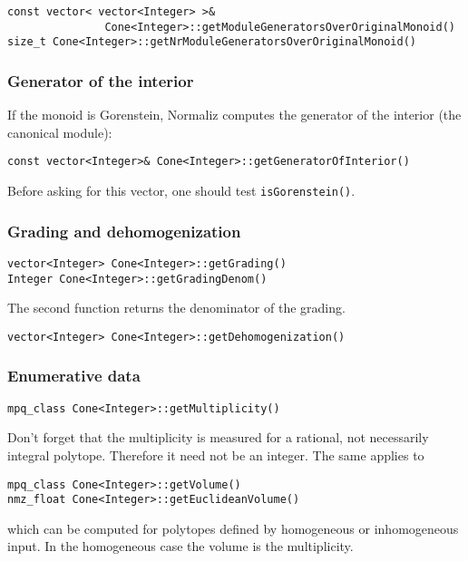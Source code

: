 \documentclass[12pt,a4paper]{scrartcl}
\theoremstyle{definition}
\begin{document}
\begin{small}
\begin{Verbatim}
const vector< vector<Integer> >& 
               Cone<Integer>::getModuleGeneratorsOverOriginalMonoid()
size_t Cone<Integer>::getNrModuleGeneratorsOverOriginalMonoid()
\end{Verbatim}

\subsubsection{Generator of the interior}\label{GenInt}

If the monoid is Gorenstein, Normaliz computes the generator of the interior (the canonical module):
\begin{Verbatim}
const vector<Integer>& Cone<Integer>::getGeneratorOfInterior()
\end{Verbatim}
Before asking for this vector, one should test \verb|isGorenstein()|. 

\subsubsection{Grading and dehomogenization}

\begin{Verbatim}
vector<Integer> Cone<Integer>::getGrading()
Integer Cone<Integer>::getGradingDenom()
\end{Verbatim}
The second function returns the denominator of the grading.

\begin{Verbatim}
vector<Integer> Cone<Integer>::getDehomogenization()
\end{Verbatim}

\subsubsection{Enumerative data}

\begin{Verbatim}
mpq_class Cone<Integer>::getMultiplicity()
\end{Verbatim}
Don't forget that the multiplicity is measured for a rational, not necessarily integral polytope. Therefore it need not be an integer. The same applies to
\begin{Verbatim}
mpq_class Cone<Integer>::getVolume()
nmz_float Cone<Integer>::getEuclideanVolume()
\end{Verbatim}
which can be computed for polytopes defined by homogeneous or inhomogeneous input. In the homogeneous case the volume is the multiplicity.


\end{small}
\end{document}
